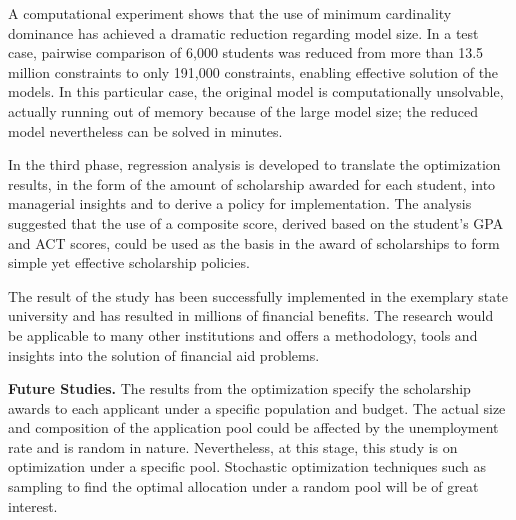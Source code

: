 \documentclass[12pt,english]{report}
\begin{document}
A computational experiment shows that the use of minimum cardinality dominance has achieved a dramatic reduction regarding model size. In a test case, pairwise comparison of 6,000 students was reduced from more than 13.5 million constraints to only 191,000 constraints, enabling effective solution of the models.  In this particular case,  the original model is computationally unsolvable, actually running out of memory because of the large model size;  the reduced model nevertheless can be solved in minutes.

In the third phase, regression analysis is developed to translate the optimization results, in the form of the  amount of scholarship awarded for each student, into managerial insights and to derive a policy for implementation.  The analysis suggested that the use of a composite score, derived based on the student's GPA and ACT scores, could be used as the basis in the award of scholarships to form simple yet effective scholarship policies.

The result of the study has been successfully implemented in the exemplary state university and has resulted in millions of financial benefits.  The research would be applicable to many other institutions and offers a methodology, tools and insights into the solution of financial aid problems. 

\noindent \textbf{Future Studies.}
The results from the optimization specify the scholarship awards to each applicant under a specific population and budget.  The actual size and composition of the application pool could be affected by the unemployment rate and is random in nature.  Nevertheless, at this stage, this study is on optimization under a specific pool.  Stochastic optimization techniques such as sampling  to find the optimal allocation under a random pool will be of great interest. 

\end{document}
